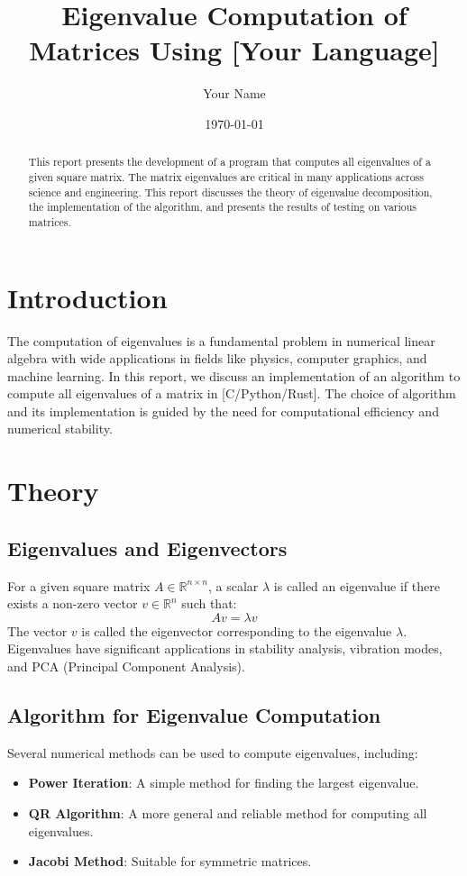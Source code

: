 \documentclass[12pt]{article}
\title{Eigenvalue Computation of Matrices Using [Your Language]}
\author{Your Name}
\date{\today}
\begin{document}
\maketitle

\begin{abstract}
This report presents the development of a program that computes all eigenvalues of a given square matrix. The matrix eigenvalues are critical in many applications across science and engineering. This report discusses the theory of eigenvalue decomposition, the implementation of the algorithm, and presents the results of testing on various matrices.
\end{abstract}

\tableofcontents
\newpage

\section{Introduction}
The computation of eigenvalues is a fundamental problem in numerical linear algebra with wide applications in fields like physics, computer graphics, and machine learning. In this report, we discuss an implementation of an algorithm to compute all eigenvalues of a matrix in [C/Python/Rust]. The choice of algorithm and its implementation is guided by the need for computational efficiency and numerical stability.

\section{Theory}
\subsection{Eigenvalues and Eigenvectors}
For a given square matrix \(A \in \mathbb{R}^{n \times n}\), a scalar \(\lambda\) is called an eigenvalue if there exists a non-zero vector \(v \in \mathbb{R}^n\) such that:
\[
A v = \lambda v
\]
The vector \(v\) is called the eigenvector corresponding to the eigenvalue \(\lambda\). Eigenvalues have significant applications in stability analysis, vibration modes, and PCA (Principal Component Analysis).

\subsection{Algorithm for Eigenvalue Computation}
Several numerical methods can be used to compute eigenvalues, including:
\begin{itemize}
    \item \textbf{Power Iteration}: A simple method for finding the largest eigenvalue.
    \item \textbf{QR Algorithm}: A more general and reliable method for computing all eigenvalues.
    \item \textbf{Jacobi Method}: Suitable for symmetric matrices.
\end{itemize}
\end{document}
